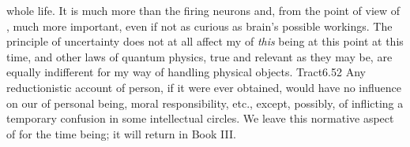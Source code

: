 whole life.  It is much more  than the firing neurons and, from the
point of view of , much more important, even if not as curious as
brain's possible workings.  The principle of uncertainty does not at all affect
my  of {\em this} being  at this point at
 this time, and other laws of quantum physics, true and relevant
as they may be, are equally indifferent for my way of handling physical objects.
\citet{We feel that even when all possible scientific questions have been
  answered, the problems of life remain completely untouched.}{Tract}{6.52} Any
reductionistic account of person, if it were ever obtained, would have no
influence on our  of personal being, moral responsibility, etc.,
except, possibly, of inflicting a temporary confusion in some intellectual
circles. We leave this normative aspect of  for the time being; it will
return in Book III. 


